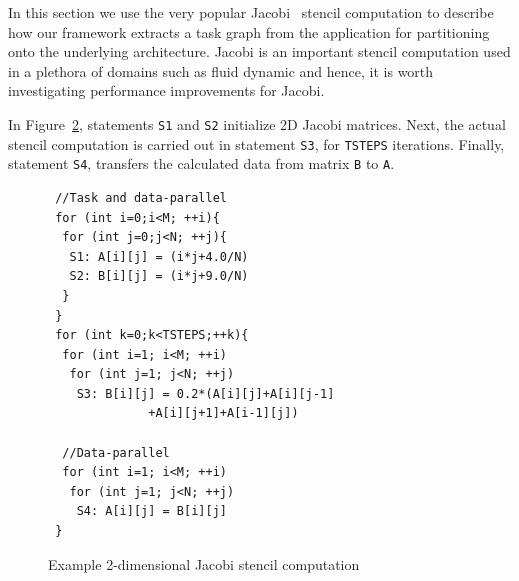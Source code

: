 \begin{figure}[t!]
{    \label{fig:5a}
  }
  \caption{}
  \label{fig:5}
\end{figure}

In this section we use the very popular Jacobi~\cite{jacobi2} stencil
computation to describe how our framework extracts a task graph from the
application for partitioning onto the underlying architecture. Jacobi is
an important stencil computation used in a plethora of domains such as
fluid dynamic and hence, it is worth investigating performance
improvements for Jacobi.

In Figure~\ref{fig:4}, statements \texttt{S1} and \texttt{S2} initialize
2D Jacobi matrices. Next, the actual stencil computation is carried out
in statement \texttt{S3}, for \texttt{TSTEPS} iterations. Finally,
statement \texttt{S4}, transfers the calculated data from matrix
\texttt{B} to \texttt{A}.

\begin{scriptsize}
  \begin{figure}[h!]
    \centering
\begin{verbatim}
 //Task and data-parallel
 for (int i=0;i<M; ++i){
  for (int j=0;j<N; ++j){
   S1: A[i][j] = (i*j+4.0/N)
   S2: B[i][j] = (i*j+9.0/N)
  }
 }
 for (int k=0;k<TSTEPS;++k){
  for (int i=1; i<M; ++i)
   for (int j=1; j<N; ++j)
    S3: B[i][j] = 0.2*(A[i][j]+A[i][j-1]
              +A[i][j+1]+A[i-1][j])

  //Data-parallel
  for (int i=1; i<M; ++i)
   for (int j=1; j<N; ++j)
    S4: A[i][j] = B[i][j]
 }
\end{verbatim}
    \caption{Example 2-dimensional Jacobi stencil computation}
    \label{fig:4}
  \end{figure}
\end{scriptsize}

